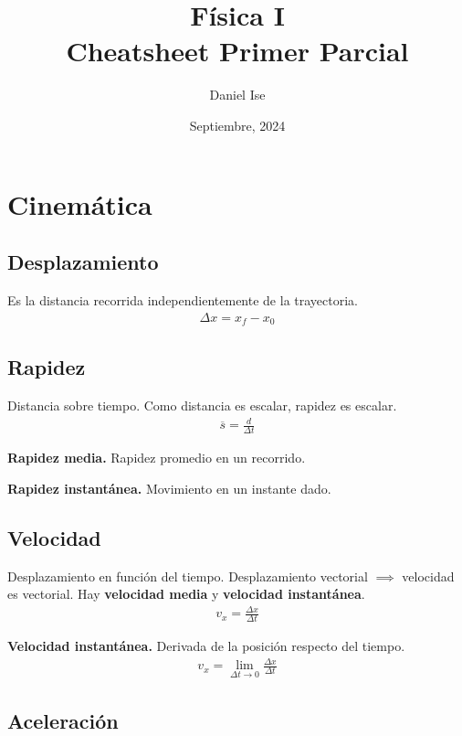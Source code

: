 \documentclass[12pt]{article}
\title{Física I\\Cheatsheet Primer Parcial}
\author{Daniel Ise}
\date{Septiembre, 2024}
\begin{document}
\maketitle

\tableofcontents

\pagebreak

\section{Cinemática}

\subsection{Desplazamiento}

Es la distancia recorrida independientemente de la trayectoria.
\begin{align*}
    \Delta x = x_{f} - x_{0}
\end{align*}

\subsection{Rapidez}

Distancia sobre tiempo. Como distancia es escalar, rapidez es escalar.
\begin{align*}
    \overline{s} = \frac{d}{\Delta t}
\end{align*}

\textbf{Rapidez media.} Rapidez promedio en un recorrido.

\textbf{Rapidez instantánea.} Movimiento en un instante dado.

\subsection{Velocidad}

Desplazamiento en función del tiempo. Desplazamiento vectorial \(\implies\) velocidad es vectorial.
Hay \textbf{velocidad media} y \textbf{velocidad instantánea}.
\begin{align*}
    v_{x} = \frac{\Delta x}{\Delta t}
\end{align*}

\textbf{Velocidad instantánea.} Derivada de la posición respecto del tiempo.
\begin{align*}
    v_{x} = \lim_{\Delta t \to 0} \frac{\Delta x}{\Delta t}
\end{align*}

\subsection{Aceleración}
\end{document}
